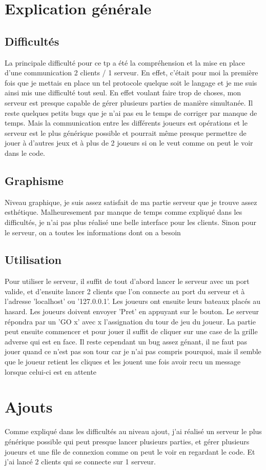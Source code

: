 \documentclass[a4paper]{article}
\date{19 Janvier 2017}
\begin{document}
\entete

\section{Explication générale}

\subsection{Difficultés}

La principale difficulté pour ce tp a été la compréhension et la mise en place d'une communication 2 clients / 1 serveur. En effet, c'était pour moi la première fois que je mettais en place un tel protocole quelque soit le langage et je me suis ainsi mis une difficulté tout seul. En effet voulant faire trop de choses, mon serveur est presque capable de gérer plusieurs parties de manière simultanée. Il reste quelques petits bugs que je n'ai pas eu le temps de corriger par manque de temps. Mais la communication entre les différents joueurs est opérations et le serveur est le plus générique possible et pourrait même presque permettre de jouer à d'autres jeux et à plus de 2 joueurs si on le veut comme on peut le voir dans le code.

\subsection{Graphisme}

Niveau graphique, je suis assez satisfait de ma partie serveur que je trouve assez esthétique. Malheuresement par manque de temps comme expliqué dans les difficultés, je n'ai pas plus réalisé une belle interface pour les clients.
Sinon pour le serveur, on a toutes les informations dont on a besoin


\subsection{Utilisation}

Pour utiliser le serveur, il suffit de tout d'abord lancer le serveur avec un port valide, et d'ensuite lancer 2 clients que l'on connecte au port du serveur et à l'adresse 'localhost' ou '127.0.0.1'. Les joueurs ont ensuite leurs bateaux placés au hasard. Les joueurs doivent envoyer 'Pret' en appuyant sur le bouton. Le serveur répondra par un 'GO x' avec x l'assignation du tour de jeu du joueur. La partie peut ensuite commencer et pour jouer il suffit de cliquer sur une case de la grille adverse qui est en face.
Il reste cependant un bug assez génant, il ne faut pas jouer quand ce n'est pas son tour car je n'ai pas compris pourquoi, mais il semble que le joueur retient les cliques et les jouent une fois avoir recu un message lorsque celui-ci est en attente

\section{Ajouts}
Comme expliqué dans les difficultés au niveau ajout, j'ai réalisé un serveur le plus générique possible qui peut presque lancer plusieurs parties, et gérer plusieurs joueurs et une file de connexion comme on peut le voir en regardant le code.
Et j'ai lancé 2 clients qui se connecte sur 1 serveur.
\end{document}
